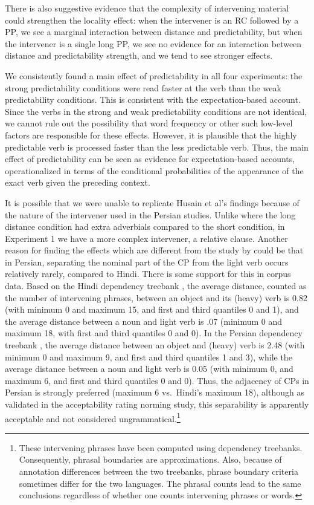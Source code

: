 \documentclass{frontiersSCNS}\usepackage{knitr} %
\begin{document}
There is also suggestive evidence that the complexity of intervening material could strengthen the locality effect: when the intervener is an RC followed by a PP, we see a marginal interaction between distance and predictability, but when the intervener is a   
single long PP, we see no evidence for an interaction between distance and predictability strength, and we tend to see stronger effects.  

We consistently found a main effect of predictability in all four experiments: the strong predictability conditions were read faster at the verb than the weak predictability conditions. This is consistent with the  expectation-based account. Since the verbs in the strong and weak predictability conditions are not identical, we cannot rule out the possibility that word frequency or other such low-level factors are responsible for these effects. However, it is plausible that the highly predictable verb is processed faster than the less predictable verb. Thus, the main effect of predictability can be seen as evidence for expectation-based accounts, operationalized in terms of the conditional probabilities of the appearance of the exact verb given the preceding context.
  
It is possible that we were unable to replicate Husain et al's findings because of the nature of the intervener used in the Persian studies. Unlike \cite{husain2014strong} where the long distance condition had extra adverbials compared to the short condition, in Experiment 1 we have a more complex intervener, a relative clause. Another reason for finding the effects which are different from the study by \cite{husain2014strong} could be that in Persian, separating the nominal part of the CP from the light verb occurs relatively rarely, compared to Hindi. There is some support for this in corpus data. 
Based on the Hindi dependency treebank \citep{bhatt2009multi}, the average distance, counted as the number of intervening phrases, between an object and its (heavy) verb is 0.82 (with minimum 0 and maximum 15, and first and third quantiles 0 and 1), and the average distance between a noun and light verb is .07 (minimum 0 and maximum 18, with first and third quantiles 0 and 0). In the Persian dependency treebank \citep{Mojganphd}, the average distance between an object and (heavy) verb is 2.48 (with minimum 0 and maximum 9, and first and third quantiles 1 and 3), while the average distance between a noun and light verb is 0.05 (with minimum 0, and maximum 6, and first and third quantiles 0 and 0). Thus, the adjacency of CPs in Persian is strongly preferred (maximum 6 vs.\ Hindi's maximum 18), although as validated in the acceptability rating norming study, this separability is apparently acceptable and not considered ungrammatical.\footnote{These intervening phrases have been computed using dependency treebanks. Consequently, phrasal boundaries are approximations. Also, because of annotation differences between the two treebanks, phrase boundary criteria sometimes differ for the two languages. The phrasal counts lead to the same conclusions regardless of whether one counts intervening phrases or words.}
\end{document}
